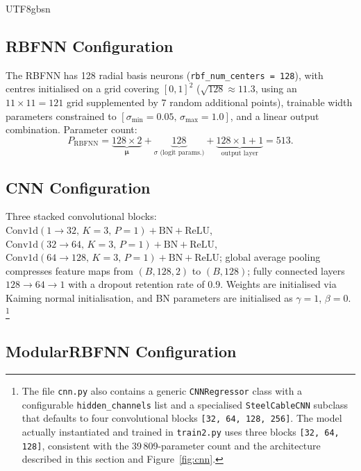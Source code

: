 \documentclass[a4paper,12pt]{report}
\begin{document}
\begin{CJK}{UTF8}{gbsn}
\subsection{RBFNN Configuration}
\label{subsec:rbfnn_config}

The RBFNN has 128 radial basis neurons (\texttt{rbf\_num\_centers = 128}), with centres
initialised on a grid covering $[0,1]^2$ ($\sqrt{128} \approx 11.3$, using an
$11 \times 11 = 121$ grid supplemented by 7 random additional points), trainable width
parameters constrained to $[\sigma_{\min} = 0.05,\, \sigma_{\max} = 1.0]$, and a linear
output combination. Parameter count:
\begin{equation}
  P_{\text{RBFNN}} = \underbrace{128 \times 2}_{\boldsymbol{\mu}} +
    \underbrace{128}_{\sigma\text{ (logit params.)}} +
    \underbrace{128 \times 1 + 1}_{\text{output layer}} = 513.
  \label{eq:rbfnn_params}
\end{equation}

\subsection{CNN Configuration}
\label{subsec:cnn_config}

Three stacked convolutional blocks: $\text{Conv1d}(1 \to 32,\,K=3,\,P=1)+\text{BN}+\text{ReLU}$,
$\text{Conv1d}(32 \to 64,\,K=3,\,P=1)+\text{BN}+\text{ReLU}$,
$\text{Conv1d}(64 \to 128,\,K=3,\,P=1)+\text{BN}+\text{ReLU}$; global average pooling
compresses feature maps from $(B,128,2)$ to $(B,128)$; fully connected layers
$128 \to 64 \to 1$ with a dropout retention rate of 0.9. Weights are initialised via
Kaiming normal initialisation, and BN parameters are initialised as $\gamma = 1$, $\beta = 0$.%
\footnote{The file \texttt{cnn.py} also contains a generic \texttt{CNNRegressor} class
with a configurable \texttt{hidden\_channels} list and a specialised
\texttt{SteelCableCNN} subclass that defaults to four convolutional blocks
\texttt{[32,\,64,\,128,\,256]}. The model actually instantiated and trained in
\texttt{train2.py} uses three blocks \texttt{[32,\,64,\,128]}, consistent with the
39\,809-parameter count and the architecture described in this section and
Figure~\ref{fig:cnn}.}

\subsection{ModularRBFNN Configuration}
\label{subsec:modular_config}


\end{CJK}
\end{document}
